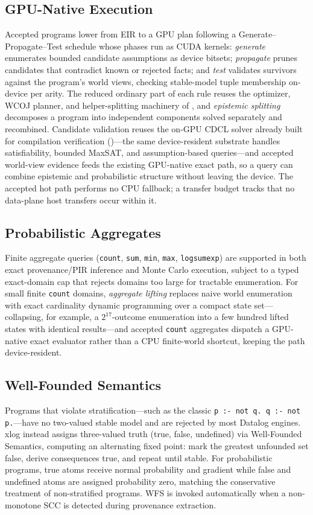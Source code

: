 \subsection{GPU-Native Execution}\label{subsec:epistemic-gpu}

Accepted programs lower from EIR to a GPU plan following a Generate--Propagate--Test schedule whose phases run as CUDA kernels: \emph{generate} enumerates bounded candidate assumptions as device bitsets; \emph{propagate} prunes candidates that contradict known or rejected facts; and \emph{test} validates survivors against the program's world views, checking stable-model tuple membership on-device per arity. The reduced ordinary part of each rule reuses the optimizer, WCOJ planner, and helper-splitting machinery of , and \emph{epistemic splitting} decomposes a program into independent components solved separately and recombined. Candidate validation reuses the on-GPU CDCL solver already built for compilation verification ()---the same device-resident substrate handles satisfiability, bounded MaxSAT, and assumption-based queries---and accepted world-view evidence feeds the existing GPU-native exact path, so a query can combine epistemic and probabilistic structure without leaving the device. The accepted hot path performs no CPU fallback; a transfer budget tracks that no data-plane host transfers occur within it.

\subsection{Probabilistic Aggregates}

Finite aggregate queries (\texttt{count}, \texttt{sum}, \texttt{min}, \texttt{max}, \texttt{logsumexp}) are supported in both exact provenance/PIR inference and Monte Carlo execution, subject to a typed exact-domain cap that rejects domains too large for tractable enumeration. For small finite \texttt{count} domains, \emph{aggregate lifting} replaces naive world enumeration with exact cardinality dynamic programming over a compact state set---collapsing, for example, a $2^{17}$-outcome enumeration into a few hundred lifted states with identical results---and accepted \texttt{count} aggregates dispatch a GPU-native exact evaluator rather than a CPU finite-world shortcut, keeping the path device-resident.

\subsection{Well-Founded Semantics}

Programs that violate stratification---such as the classic \texttt{p :- not q.\ q :- not p.}---have no two-valued stable model and are rejected by most Datalog engines. xlog instead assigns three-valued truth (true, false, undefined) via Well-Founded Semantics, computing an alternating fixed point: mark the greatest unfounded set false, derive consequences true, and repeat until stable. For probabilistic programs, true atoms receive normal probability and gradient while false and undefined atoms are assigned probability zero, matching the conservative treatment of non-stratified programs. WFS is invoked automatically when a non-monotone SCC is detected during provenance extraction.
